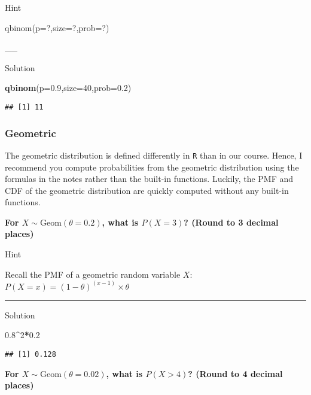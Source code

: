 \documentclass[
]{book}
\newenvironment{Shaded}{\begin{snugshade}}{\end{snugshade}}
\newcommand{\AttributeTok}[1]{\textcolor[rgb]{0.13,0.29,0.53}{#1}}
\newcommand{\DecValTok}[1]{\textcolor[rgb]{0.00,0.00,0.81}{#1}}
\newcommand{\FloatTok}[1]{\textcolor[rgb]{0.00,0.00,0.81}{#1}}
\newcommand{\FunctionTok}[1]{\textcolor[rgb]{0.13,0.29,0.53}{\textbf{#1}}}
\newcommand{\NormalTok}[1]{#1}
\newcommand{\SpecialCharTok}[1]{\textcolor[rgb]{0.81,0.36,0.00}{\textbf{#1}}}
\begin{document}
Hint

qbinom(p=?,size=?,prob=?)

\_\_

Solution

\begin{Shaded}
\begin{Highlighting}[]
\FunctionTok{qbinom}\NormalTok{(}\AttributeTok{p=}\FloatTok{0.9}\NormalTok{,}\AttributeTok{size=}\DecValTok{40}\NormalTok{,}\AttributeTok{prob=}\FloatTok{0.2}\NormalTok{)}
\end{Highlighting}
\end{Shaded}

\begin{verbatim}
## [1] 11
\end{verbatim}

\hypertarget{geometric}{%
\subsubsection{Geometric}\label{geometric}}

The geometric distribution is defined differently in \texttt{R} than in our course. Hence, I recommend you compute probabilities from the geometric distribution using the formulas in the notes rather than the built-in functions. Luckily, the PMF and CDF of the geometric distribution are quickly computed without any built-in functions.

\textbf{For \(X \sim \mbox{Geom}(\theta=0.2)\), what is \(P(X=3)\)? (Round to 3 decimal places)}

Hint

Recall the PMF of a geometric random variable \(X\): \(P(X=x)=(1-\theta)^{(x-1)}\times \theta\)

\begin{center}\rule{0.5\linewidth}{0.5pt}\end{center}

Solution

\begin{Shaded}
\begin{Highlighting}[]
\FloatTok{0.8}\SpecialCharTok{\^{}}\DecValTok{2}\SpecialCharTok{*}\FloatTok{0.2}
\end{Highlighting}
\end{Shaded}

\begin{verbatim}
## [1] 0.128
\end{verbatim}

\textbf{For \(X \sim \mbox{Geom}(\theta=0.02)\), what is \(P(X>4)\)? (Round to 4 decimal places)}
\end{document}

